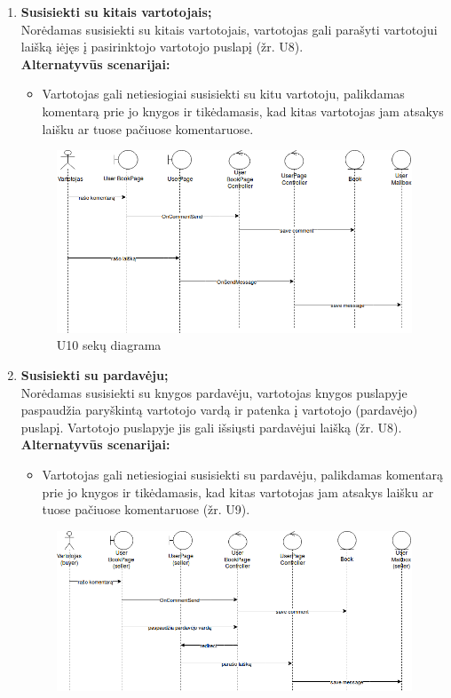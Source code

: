 \documentclass{VUMIFPSkursinis}
\begin{document}
\begin{enumerate}[label=\textbf{U\arabic*.}]
			\item \textbf{Susisiekti su kitais vartotojais;}\\
				Norėdamas susisiekti su kitais vartotojais, vartotojas gali parašyti vartotojui laišką iėjęs į pasirinktojo vartotojo puslapį (žr. U8).\\
				\textbf{Alternatyvūs scenarijai:}
				\begin{itemize}
					\item Vartotojas gali netiesiogiai susisiekti su kitu vartotoju, palikdamas komentarą prie jo knygos ir tikėdamasis, kad kitas vartotojas jam atsakys laišku ar tuose pačiuose komentaruose.
				\end{itemize}
				\begin{figure}[H]
					\centering
					\includegraphics[scale=0.6]{img/10seq.png}
					\caption{U10 sekų diagrama}
					\label{img:psi2-u10-sequence}
				\end{figure}
			\item \textbf{Susisiekti su pardavėju;}\\
				Norėdamas susisiekti su knygos pardavėju, vartotojas knygos puslapyje paspaudžia paryškintą vartotojo vardą ir patenka į vartotojo (pardavėjo) puslapį. Vartotojo puslapyje jis gali išsiųsti pardavėjui laišką (žr. U8).\\
				\textbf{Alternatyvūs scenarijai:}
				\begin{itemize}
					\item Vartotojas gali netiesiogiai susisiekti su pardavėju, palikdamas komentarą prie jo knygos ir tikėdamasis, kad kitas vartotojas jam atsakys laišku ar tuose pačiuose komentaruose (žr. U9).
				\end{itemize}
				\begin{figure}[H]
					\centering
					\includegraphics[scale=0.6]{img/11seq.png}

\end{figure}
\end{enumerate}
\end{document}
